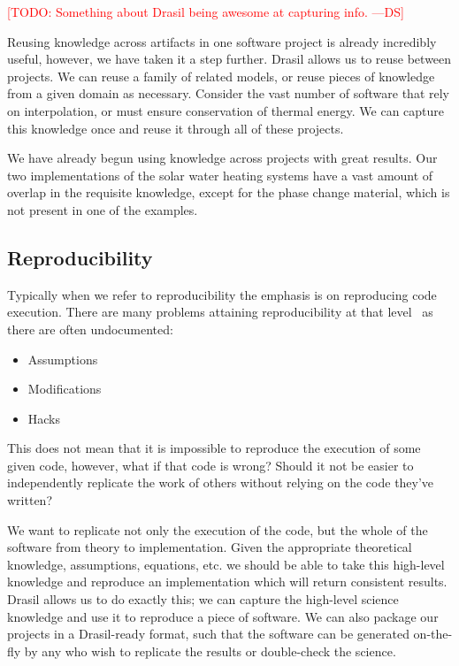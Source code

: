 \documentclass[sigconf]{acmart}
\newcommand{\authornt}[3]{\textcolor{#1}{[#3 ---#2]}}
\newcommand{\authornt}[3]{}
\newcommand{\ds}[1]{\authornt{red}{DS}{#1}} %
\begin{document}
\ds{TODO: Something about Drasil being awesome at capturing info.}

Reusing knowledge across artifacts in one software project is already 
incredibly useful, however, we have taken it a step further. Drasil allows us 
to reuse between projects. We can reuse a family of related models, or reuse 
pieces of knowledge from a given domain as necessary. Consider the vast number 
of software that rely on interpolation, or must ensure conservation of thermal 
energy. We can capture this knowledge once and reuse it through all of these 
projects.

We have already begun using knowledge across projects with great results. Our 
two implementations of the solar water heating systems have a vast amount of 
overlap in the requisite knowledge, except for the phase change material, which 
is not present in one of the examples.

\subsection{Reproducibility}

Typically when we refer to reproducibility the emphasis is on reproducing code 
execution. There are many problems attaining reproducibility at that 
level~\cite{IonescuAndJansson2013} as there are often undocumented:

\begin{itemize}
\item Assumptions
\item Modifications
\item Hacks
\end{itemize}

This does not mean that it is impossible to reproduce the execution of some 
given code, however, what if that code is wrong? Should it not be easier to 
independently replicate the work of others without relying on the code they've 
written?

We want to replicate not only the execution of the code, but the whole of the 
software from theory to implementation. Given the appropriate theoretical 
knowledge, assumptions, equations, etc. we should be able to take this 
high-level knowledge and reproduce an implementation which will return 
consistent results. Drasil allows us to do exactly this; we can capture the 
high-level science knowledge and use it to reproduce a piece of software. We 
can also package our projects in a Drasil-ready format, such that the software 
can be generated on-the-fly by any who wish to replicate the results or 
double-check the science.
\end{document}
